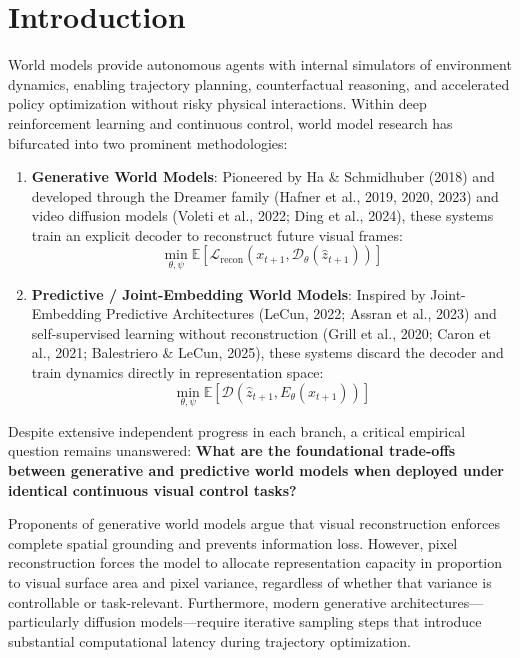 \documentclass{article}
\begin{document}
\section{Introduction}

World models provide autonomous agents with internal simulators of environment dynamics, enabling trajectory planning, counterfactual reasoning, and accelerated policy optimization without risky physical interactions. Within deep reinforcement learning and continuous control, world model research has bifurcated into two prominent methodologies:
\begin{enumerate}
    \item \textbf{Generative World Models}: Pioneered by Ha \& Schmidhuber (2018) and developed through the Dreamer family (Hafner et al., 2019, 2020, 2023) and video diffusion models (Voleti et al., 2022; Ding et al., 2024), these systems train an explicit decoder to reconstruct future visual frames:
    \begin{equation}
        \min_{\theta, \psi} \mathbb{E}\left[ \mathcal{L}_{\text{recon}}(x_{t+1}, \mathcal{D}_\theta(\hat{z}_{t+1})) \right]
    \end{equation}
    \item \textbf{Predictive / Joint-Embedding World Models}: Inspired by Joint-Embedding Predictive Architectures (LeCun, 2022; Assran et al., 2023) and self-supervised learning without reconstruction (Grill et al., 2020; Caron et al., 2021; Balestriero \& LeCun, 2025), these systems discard the decoder and train dynamics directly in representation space:
    \begin{equation}
        \min_{\theta, \psi} \mathbb{E}\left[ \mathcal{D}(\hat{z}_{t+1}, E_\theta(x_{t+1})) \right]
    \end{equation}
\end{enumerate}

Despite extensive independent progress in each branch, a critical empirical question remains unanswered: \textbf{What are the foundational trade-offs between generative and predictive world models when deployed under identical continuous visual control tasks?}

Proponents of generative world models argue that visual reconstruction enforces complete spatial grounding and prevents information loss. However, pixel reconstruction forces the model to allocate representation capacity in proportion to visual surface area and pixel variance, regardless of whether that variance is controllable or task-relevant. Furthermore, modern generative architectures—particularly diffusion models—require iterative sampling steps that introduce substantial computational latency during trajectory optimization.
\end{document}
